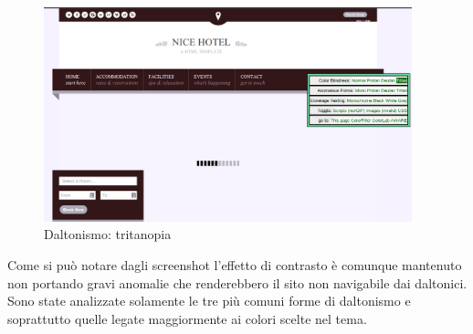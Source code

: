 \documentclass[a4paper,12pt,hidelinks]{report}
\begin{document}
\begin{figure}[h!]%
  \includegraphics[width=0.95\textwidth,keepaspectratio=true]{../img/daltonismoTritanopia}
  \centering
  \caption{Daltonismo: tritanopia}%
  \label{fig:daltonismoTritanopia}%
\end{figure}
Come si può notare dagli screenshot l'effetto di contrasto è comunque mantenuto non portando gravi anomalie che renderebbero il sito non navigabile dai daltonici. 
\\Sono state analizzate solamente le tre più comuni forme di daltonismo e soprattutto quelle legate maggiormente ai colori scelte nel tema.
\end{document}
